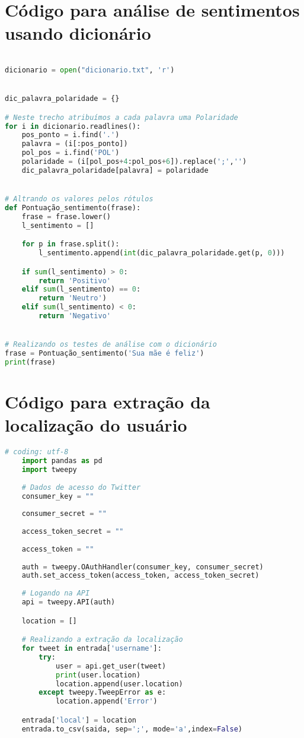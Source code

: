 \section{Código para análise de sentimentos usando dicionário}
\label{cod:analise}

\begin{lstlisting}[language=Python]

dicionario = open("dicionario.txt", 'r')


dic_palavra_polaridade = {} 

# Neste trecho atribuímos a cada palavra uma Polaridade
for i in dicionario.readlines(): 
    pos_ponto = i.find('.')
    palavra = (i[:pos_ponto])
    pol_pos = i.find('POL')
    polaridade = (i[pol_pos+4:pol_pos+6]).replace(';','')
    dic_palavra_polaridade[palavra] = polaridade


# Altrando os valores pelos rótulos
def Pontuação_sentimento(frase):
    frase = frase.lower()
    l_sentimento = []

    for p in frase.split():
        l_sentimento.append(int(dic_palavra_polaridade.get(p, 0)))

    if sum(l_sentimento) > 0:
        return 'Positivo'
    elif sum(l_sentimento) == 0:
        return 'Neutro')
    elif sum(l_sentimento) < 0:
        return 'Negativo'


# Realizando os testes de análise com o dicionário
frase = Pontuação_sentimento('Sua mãe é feliz')
print(frase)
\end{lstlisting}


\section{Código para extração da localização do usuário}
\label{cod:geo}
\begin{lstlisting}[language=Python]
    # coding: utf-8
    import pandas as pd  
    import tweepy
    
    # Dados de acesso do Twitter
    consumer_key = ""
    
    consumer_secret = ""
    
    access_token_secret = ""
    
    access_token = ""
    
    auth = tweepy.OAuthHandler(consumer_key, consumer_secret)
    auth.set_access_token(access_token, access_token_secret)
    
    # Logando na API
    api = tweepy.API(auth)

    location = []

    # Realizando a extração da localização
    for tweet in entrada['username']:
        try:
            user = api.get_user(tweet)
            print(user.location)
            location.append(user.location)
        except tweepy.TweepError as e:
            location.append('Error')

    entrada['local'] = location
    entrada.to_csv(saida, sep=';', mode='a',index=False)
    
    
\end{lstlisting}

